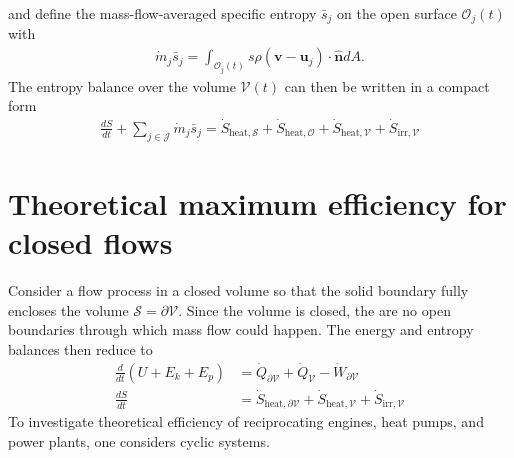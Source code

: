 and define the mass-flow-averaged specific entropy $\bar{s}_j$ on the open surface $\mathcal{O}_j(t)$ with 
\begin{align}
    \dot{m}_j\bar{s}_j=\int_{\mathcal{O}_j(t)}s\rho(\bm{v}-\bm{u}_j)\cdot\bm{\hat{n}}dA.
\end{align}
The entropy balance over the volume $\mathcal{V}(t)$ can then be written in a compact form
\begin{align}
    \frac{dS}{dt}+\sum_{j\in\mathcal{J}}\dot{m}_j\bar{s}_j=\dot{S}_{\text{heat},\mathcal{S}}+\dot{S}_{\text{heat},\mathcal{O}}+\dot{S}_{\text{heat},\mathcal{V}}+\dot{S}_{\text{irr},\mathcal{V}}
\end{align}


\section{Theoretical maximum efficiency for closed flows}
Consider a flow process in a closed volume so that the solid boundary fully encloses the volume $\mathcal{S}=\partial\mathcal{V}$. Since the volume is closed, the are no open boundaries through which mass flow could happen. The energy and entropy balances then reduce to 
\begin{align}
    \frac{d}{dt}(U+E_k+E_p)&=\dot{Q}_{\partial \mathcal{V}}+\dot{Q}_{\mathcal{V}}-\dot{W}_{\partial \mathcal{V}}\\
    \frac{dS}{dt}&=\dot{S}_{\text{heat},\partial \mathcal{V}}+\dot{S}_{\text{heat},\mathcal{V}}+\dot{S}_{\text{irr},\mathcal{V}}
\end{align}
To investigate theoretical efficiency of reciprocating engines, heat pumps, and power plants, one considers cyclic systems.

